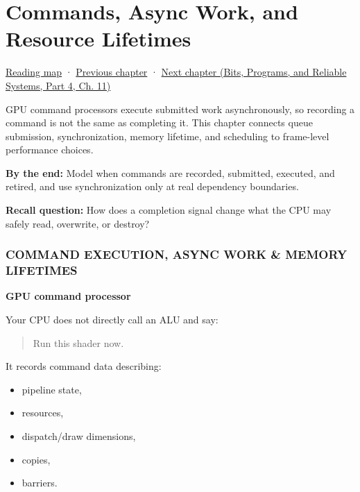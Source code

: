 \chapter{Commands, Async Work, and Resource Lifetimes}\label{01-foundations-i-ch012-commands-async-work-and-resource-lifetimes}\hypertarget{01-foundations-i-ch012}{}\label{stagechapter:01-foundations-i-ch012}

\hypertarget{01-foundations-i-ch012-commands-async-work-and-resource-lifetimes}{}

\hyperref[volume-reading-map]{Reading map} · \hyperref[01-foundations-i-ch011-c-const-borrowing-and-cpugpu-buffering]{Previous chapter} · \href{../01-Bits-Programs-and-Reliable-Systems-P04/main.pdf\#05-engine-i-ch001}{Next chapter (Bits, Programs, and Reliable Systems, Part 4, Ch. 11)}

GPU command processors execute submitted work asynchronously, so recording a command is not the same as completing it. This chapter connects queue submission, synchronization, memory lifetime, and scheduling to frame-level performance choices.

\textbf{By the end:} Model when commands are recorded, submitted, executed, and retired, and use synchronization only at real dependency boundaries.

\textbf{Recall question:} How does a completion signal change what the CPU may safely read, overwrite, or destroy?

\subsection{COMMAND EXECUTION, ASYNC WORK \& MEMORY LIFETIMES}\label{01-foundations-i-ch012-command-execution-async-work-memory-lifetimes}

\hypertarget{01-foundations-i-ch012-command-execution-async-work-memory-lifetimes}{}

\textbf{GPU command processor}

Your CPU does not directly call an ALU and say:

\begin{quote}
Run this shader now.
\end{quote}

It records command data describing:

\begin{itemize}
\tightlist
\item
  pipeline state,
\item
  resources,
\item
  dispatch/draw dimensions,
\item
  copies,
\item
  barriers.
\end{itemize}

